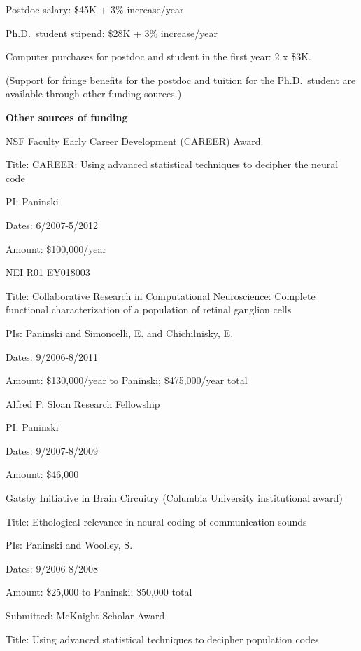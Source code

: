 \documentclass[12pt]{article}
\newcommand{\vs}{\vspace{5mm}}
\begin{document}
Postdoc salary: \$45K + 3\% increase/year

Ph.D.\ student stipend: \$28K + 3\% increase/year

Computer purchases for postdoc and student in the first year: 2 x
\$3K.

(Support for fringe benefits for the postdoc and tuition for the
Ph.D.\ student are available through other funding sources.)


\clearpage

\noindent \textbf{Other sources of funding}

\vs

NSF Faculty Early Career Development (CAREER) Award.

Title: CAREER: Using advanced statistical techniques to decipher the
    neural code

PI: Paninski

Dates: 6/2007-5/2012

Amount: \$100,000/year

\vs


NEI R01 EY018003

Title: Collaborative Research in Computational Neuroscience: Complete
 functional characterization of a population of retinal ganglion cells

PIs:  Paninski and Simoncelli, E. and Chichilnisky, E.

Dates: 9/2006-8/2011

Amount: \$130,000/year to Paninski; \$475,000/year total

\vs


Alfred P. Sloan Research Fellowship 

PI: Paninski

Dates: 9/2007-8/2009

Amount: \$46,000

\vs


Gatsby Initiative in Brain Circuitry (Columbia University institutional award)

Title: Ethological relevance in neural coding of communication sounds

PIs: Paninski and Woolley, S.

Dates: 9/2006-8/2008

Amount: \$25,000 to Paninski; \$50,000 total


\vs

Submitted: McKnight Scholar Award

Title: Using advanced statistical techniques to decipher population
codes
\end{document}
